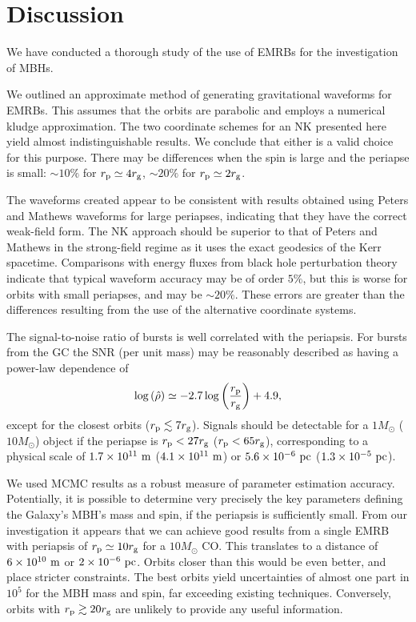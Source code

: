 \section{Discussion}\label{sec:End}

We have conducted a thorough study of the use of EMRBs for the investigation of MBHs.

We outlined an approximate method of generating gravitational waveforms for EMRBs. This assumes that the orbits are parabolic and employs a numerical kludge approximation. The two coordinate schemes for an NK presented here yield almost indistinguishable results. We conclude that either is a valid choice for this purpose. There may be differences when the spin is large and the periapse is small: $\sim 10\%$ for $r_\mathrm{p} \simeq 4 r_\mathrm{g}$, $\sim 20\%$ for $r_\mathrm{p} \simeq 2 r_\mathrm{g}$.

The waveforms created appear to be consistent with results obtained using Peters and Mathews waveforms for large periapses, indicating that they have the correct weak-field form. The NK approach should be superior to that of Peters and Mathews in the strong-field regime as it uses the exact geodesics of the Kerr spacetime. Comparisons with energy fluxes from black hole perturbation theory indicate that typical waveform accuracy may be of order $5\%$, but this is worse for orbits with small periapses, and may be $\sim 20\%$. These errors are greater than the differences resulting from the use of the alternative coordinate systems.

The signal-to-noise ratio of bursts is well correlated with the periapsis. For bursts from the GC the SNR (per unit mass) may be reasonably described as having a power-law dependence of
\begin{equation}
\log\left(\hat{\rho}\right) \simeq -2.7\log\left(\frac{r_\mathrm{p}}{r_\mathrm{g}}\right) + 4.9,
\end{equation}
except for the closest orbits ($r_\mathrm{p} \lesssim 7 r_\mathrm{g}$). Signals should be detectable for a $1 M_\odot$ ($10 M_\odot$) object if the periapse is $r_\mathrm{p} < 27 r_\mathrm{g}$ ($r_\mathrm{p} < 65 r_\mathrm{g}$), corresponding to a physical scale of $1.7 \times 10^{11}~\mathrm{m}$ ($4.1 \times 10^{11}~\mathrm{m}$) or $5.6 \times 10^{-6}~\mathrm{pc}$ ($1.3 \times 10^{-5}~\mathrm{pc}$).

We used MCMC results as a robust measure of parameter estimation accuracy. Potentially, it is possible to determine very precisely the key parameters defining the Galaxy's MBH's mass and spin, if the periapsis is sufficiently small. From our investigation it appears that we can achieve good results from a single EMRB with periapsis of $r_\mathrm{p} \simeq 10 r_\mathrm{g}$ for a $10 M_\odot$ CO. This translates to a distance of $6 \times 10^{10}~\mathrm{m}$ or $2 \times 10^{-6}~\mathrm{pc}$. Orbits closer than this would be even better, and place stricter constraints. The best orbits yield uncertainties of almost one part in $10^5$ for the MBH mass and spin, far exceeding existing techniques. Conversely, orbits with $r_\mathrm{p} \gtrsim 20 r_\mathrm{g}$ are unlikely to provide any useful information.


